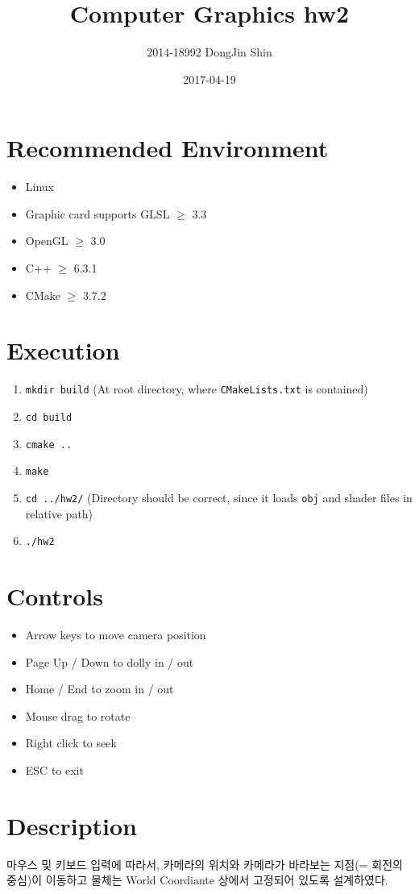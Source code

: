 \documentclass[11pt]{oblivoir}
\title{Computer Graphics hw2}
\date{2017-04-19}
\author{2014-18992 DongJin Shin}
\begin{document}
	
\maketitle

\section{Recommended Environment}

\begin{itemize}
\item Linux
\item Graphic card supports GLSL $\geq$ 3.3
\item OpenGL $\geq$ 3.0
\item C++ $\geq$ 6.3.1
\item CMake $\geq$ 3.7.2
\end{itemize}

\section{Execution}

\begin{enumerate}
\item \verb|mkdir build| (At root directory, where \verb|CMakeLists.txt| is contained)
\item \verb|cd build|
\item \verb|cmake ..|
\item \verb|make|
\item \verb|cd ../hw2/| (Directory should be correct, since it loads \verb|obj| and shader files in relative path)
\item \verb|./hw2|
\end{enumerate}

\section{Controls}
\begin{itemize}
\item Arrow keys to move camera position
\item Page Up / Down to dolly in / out
\item Home / End to zoom in / out
\item Mouse drag to rotate
\item Right click to seek
\item ESC to exit
\end{itemize}

\section{Description}
마우스 및 키보드 입력에 따라서, 카메라의 위치와 카메라가 바라보는 지점(= 회전의 중심)이 이동하고 물체는 World Coordiante 상에서 고정되어 있도록 설계하였다.
\end{document}
